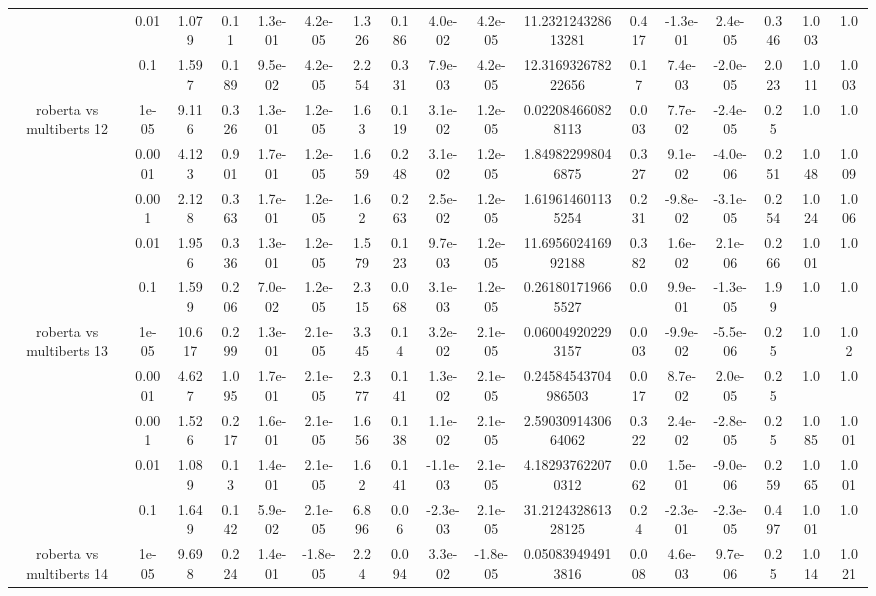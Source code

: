 \begin{tabular}{|c|c|c|c|c|c|c|c|c|c|c|c|c|c|c|c|c|}
 & 0.01 & 1.079 & 0.11 & 1.3e-01 & 4.2e-05 & 1.326 & 0.186 & 4.0e-02 & 4.2e-05 & 11.232124328613281 & 0.417 & -1.3e-01 & 2.4e-05 & 0.346 & 1.003 & 1.0 \\
 & 0.1 & 1.597 & 0.189 & 9.5e-02 & 4.2e-05 & 2.254 & 0.331 & 7.9e-03 & 4.2e-05 & 12.316932678222656 & 0.17 & 7.4e-03 & -2.0e-05 & 2.023 & 1.011 & 1.003 \\
\hline
\multirow{5}{*}{roberta  vs multiberts 12} & 1e-05 & 9.116 & 0.326 & 1.3e-01 & 1.2e-05 & 1.63 & 0.119 & 3.1e-02 & 1.2e-05 & 0.022084660828113 & 0.003 & 7.7e-02 & -2.4e-05 & 0.25 & 1.0 & 1.0 \\
 & 0.0001 & 4.123 & 0.901 & 1.7e-01 & 1.2e-05 & 1.659 & 0.248 & 3.1e-02 & 1.2e-05 & 1.849822998046875 & 0.327 & 9.1e-02 & -4.0e-06 & 0.251 & 1.048 & 1.009 \\
 & 0.001 & 2.128 & 0.363 & 1.7e-01 & 1.2e-05 & 1.62 & 0.263 & 2.5e-02 & 1.2e-05 & 1.619614601135254 & 0.231 & -9.8e-02 & -3.1e-05 & 0.254 & 1.024 & 1.006 \\
 & 0.01 & 1.956 & 0.336 & 1.3e-01 & 1.2e-05 & 1.579 & 0.123 & 9.7e-03 & 1.2e-05 & 11.695602416992188 & 0.382 & 1.6e-02 & 2.1e-06 & 0.266 & 1.001 & 1.0 \\
 & 0.1 & 1.599 & 0.206 & 7.0e-02 & 1.2e-05 & 2.315 & 0.068 & 3.1e-03 & 1.2e-05 & 0.261801719665527 & 0.0 & 9.9e-01 & -1.3e-05 & 1.99 & 1.0 & 1.0 \\
\hline
\multirow{5}{*}{roberta  vs multiberts 13} & 1e-05 & 10.617 & 0.299 & 1.3e-01 & 2.1e-05 & 3.345 & 0.14 & 3.2e-02 & 2.1e-05 & 0.060049202293157 & 0.003 & -9.9e-02 & -5.5e-06 & 0.25 & 1.0 & 1.02 \\
 & 0.0001 & 4.627 & 1.095 & 1.7e-01 & 2.1e-05 & 2.377 & 0.141 & 1.3e-02 & 2.1e-05 & 0.24584543704986503 & 0.017 & 8.7e-02 & 2.0e-05 & 0.25 & 1.0 & 1.0 \\
 & 0.001 & 1.526 & 0.217 & 1.6e-01 & 2.1e-05 & 1.656 & 0.138 & 1.1e-02 & 2.1e-05 & 2.5903091430664062 & 0.322 & 2.4e-02 & -2.8e-05 & 0.25 & 1.085 & 1.001 \\
 & 0.01 & 1.089 & 0.13 & 1.4e-01 & 2.1e-05 & 1.62 & 0.141 & -1.1e-03 & 2.1e-05 & 4.182937622070312 & 0.062 & 1.5e-01 & -9.0e-06 & 0.259 & 1.065 & 1.001 \\
 & 0.1 & 1.649 & 0.142 & 5.9e-02 & 2.1e-05 & 6.896 & 0.06 & -2.3e-03 & 2.1e-05 & 31.212432861328125 & 0.24 & -2.3e-01 & -2.3e-05 & 0.497 & 1.001 & 1.0 \\
\hline
\multirow{5}{*}{roberta  vs multiberts 14} & 1e-05 & 9.698 & 0.224 & 1.4e-01 & -1.8e-05 & 2.24 & 0.094 & 3.3e-02 & -1.8e-05 & 0.050839494913816 & 0.008 & 4.6e-03 & 9.7e-06 & 0.25 & 1.014 & 1.021 \\

\end{tabular}

